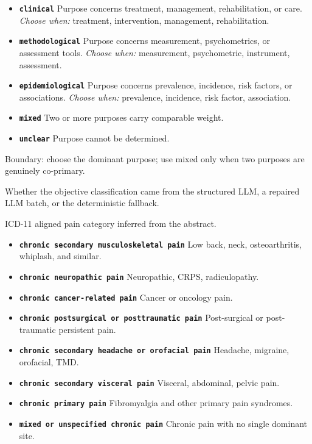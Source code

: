 \documentclass[11pt]{article}
\begin{document}
\begin{description}
\begin{itemize}[leftmargin=1.3em,itemsep=2pt,topsep=2pt]
  \item \textbf{\texttt{clinical}} Purpose concerns treatment, management, rehabilitation, or care. {\small \textit{Choose when:} treatment, intervention, management, rehabilitation.}
  \item \textbf{\texttt{methodological}} Purpose concerns measurement, psychometrics, or assessment tools. {\small \textit{Choose when:} measurement, psychometric, instrument, assessment.}
  \item \textbf{\texttt{epidemiological}} Purpose concerns prevalence, incidence, risk factors, or associations. {\small \textit{Choose when:} prevalence, incidence, risk factor, association.}
  \item \textbf{\texttt{mixed}} Two or more purposes carry comparable weight.
  \item \textbf{\texttt{unclear}} Purpose cannot be determined.
  \end{itemize}
{\small Boundary: choose the dominant purpose; use mixed only when two purposes are genuinely co-primary.}
\item[\texttt{objective\_category\_source}] Whether the objective classification came from the structured LLM, a repaired LLM batch, or the deterministic fallback.
\item[\texttt{icd11\_pain\_category}] ICD-11 aligned pain category inferred from the abstract.
  \begin{itemize}[leftmargin=1.3em,itemsep=2pt,topsep=2pt]
  \item \textbf{\texttt{chronic secondary musculoskeletal pain}} Low back, neck, osteoarthritis, whiplash, and similar.
  \item \textbf{\texttt{chronic neuropathic pain}} Neuropathic, CRPS, radiculopathy.
  \item \textbf{\texttt{chronic cancer-related pain}} Cancer or oncology pain.
  \item \textbf{\texttt{chronic postsurgical or posttraumatic pain}} Post-surgical or post-traumatic persistent pain.
  \item \textbf{\texttt{chronic secondary headache or orofacial pain}} Headache, migraine, orofacial, TMD.
  \item \textbf{\texttt{chronic secondary visceral pain}} Visceral, abdominal, pelvic pain.
  \item \textbf{\texttt{chronic primary pain}} Fibromyalgia and other primary pain syndromes.
  \item \textbf{\texttt{mixed or unspecified chronic pain}} Chronic pain with no single dominant site.

\end{itemize}
\end{description}
\end{document}
